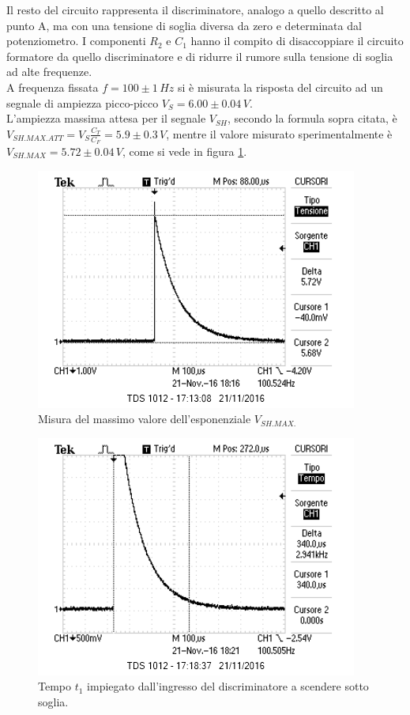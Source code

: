 \documentclass[10pt,a4paper]{article}
\begin{document}
Il resto del circuito rappresenta il discriminatore, analogo a quello descritto al punto A, ma con una tensione di soglia diversa da zero e determinata dal potenziometro. I componenti $R_2$ e $C_1$ hanno il compito di disaccoppiare il circuito formatore da quello discriminatore e di ridurre il rumore sulla tensione di soglia ad alte frequenze.\\
A frequenza fissata $f = 100\pm 1 \, Hz$ si è misurata la risposta del circuito ad un segnale di ampiezza picco-picco $V_S = 6.00 \pm 0.04 \, V$.\\
L'ampiezza massima attesa per il segnale $V_{SH}$, secondo la formula sopra citata, è $V_{SH.MAX.ATT} = V_S \frac{C_T}{C_F} =  5.9 \pm 0.3 \, V$, mentre il valore misurato sperimentalmente è $V_{SH.MAX} = 5.72 \pm 0.04 \, V$, come si vede in figura \ref{esponenziale}.\\

\begin{figure}[htb!]
\centering
\includegraphics[scale=1.0]{immagini/esponenziale.png}
\caption{Misura del massimo valore dell'esponenziale $V_{SH.MAX.}$}
\label{esponenziale}
\end{figure}

\begin{figure}[htb!]
\centering
\includegraphics[scale=1.0]{immagini/periodoEsponenziale.png}
\caption{Tempo $t_1$ impiegato dall'ingresso del discriminatore a scendere sotto soglia.}
\label{tempoEspo}
\end{figure}
\end{document}
